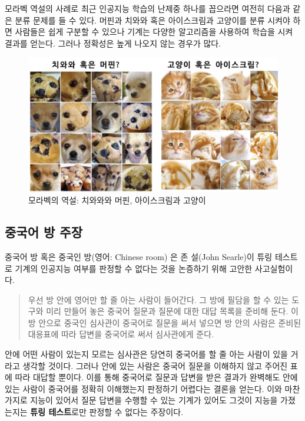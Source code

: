 \documentclass[smallextended]{svjour3}       %
\begin{document}
모라벡 역설의 사례로 최근 인공지능 학습의 난제중 하나를 꼽으라면 여전히
다음과 같은 분류 문제를 들 수 있다. 머핀과 치와와 혹은 아이스크림과
고양이를 분류 시켜야 하면 사람들은 쉽게 구분할 수 있으나 기계는 다양한
알고리즘을 사용하여 학습을 시켜 결과를 얻는다. 그러나 정확성은 높게
나오지 않는 경우가 많다.

\begin{figure}

{\centering \includegraphics[width=1\linewidth]{fig/moravec-paradox} 

}

\caption{모라벡의 역설: 치와와와 머핀, 아이스크림과 고양이}\label{fig:unnamed-chunk-4}
\end{figure}

\hypertarget{chinese-room}{%
\subsection{중국어 방 주장}\label{chinese-room}}

중국어 방 혹은 중국인 방(영어: Chinese room) \cite{wikipedia_2019}은 존
설(John Searle)이 튜링 테스트로 기계의 인공지능 여부를 판정할 수 없다는
것을 논증하기 위해 고안한 사고실험이다.

\begin{quote}
우선 방 안에 영어만 할 줄 아는 사람이 들어간다. 그 방에 필담을 할 수
있는 도구와 미리 만들어 놓은 중국어 질문과 질문에 대한 대답 목록을
준비해 둔다. 이 방 안으로 중국인 심사관이 중국어로 질문을 써서 넣으면 방
안의 사람은 준비된 대응표에 따라 답변을 중국어로 써서 심사관에게 준다.
\end{quote}

안에 어떤 사람이 있는지 모르는 심사관은 당연히 중국어를 할 줄 아는
사람이 있을 거라고 생각할 것이다. 그러나 안에 있는 사람은 중국어 질문을
이해하지 않고 주어진 표에 따라 대답할 뿐이다. 이를 통해 중국어로 질문과
답변을 받은 결과가 완벽해도 안에 있는 사람이 중국어를 정확히 이해했는지
판정하기 어렵다는 결론을 얻는다. 이와 마찬가지로 지능이 있어서 질문
답변을 수행할 수 있는 기계가 있어도 그것이 지능을 가졌는지는
\textbf{튜링 테스트}로만 판정할 수 없다는 주장이다.
\end{document}
